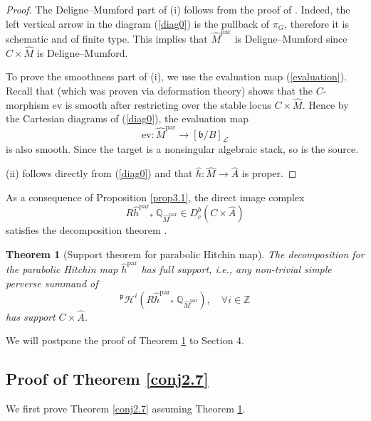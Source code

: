 \documentclass[11pt]{amsart}
\theoremstyle{plain}
\newtheorem{thm}{Theorem}[section]
\theoremstyle{definition}
\theoremstyle{remark}
\newcommand{\BQ}{{\mathbb{Q}}}
\newcommand{\BZ}{{\mathbb{Z}}}
\newcommand{\CH}{{\mathcal H}}
\newcommand{\CL}{{\mathcal L}}
\begin{document}
\begin{proof}
The Deligne--Mumford part of (i) follows from the proof of \cite[Proposition 2.5.1 (3)]{Yun1}. Indeed, the left vertical arrow in the diagram (\ref{diag0}) is the pullback of $\pi_G$, therefore it is schematic and of finite type. This implies that $\widehat{M}^{\mathrm{par}}$ is Deligne--Mumford since $C \times \widehat{M}$ is Deligne--Mumford.

To prove the smoothness part of (i), we use the evaluation map (\ref{evaluation}). Recall that \cite[Proposition 4.1]{MS} (which was proven via deformation theory) shows that the $C$-morphism $\mathrm{ev}$ is smooth after restricting over the stable locus $C \times \widehat{M}$. Hence by the Cartesian diagrams of (\ref{diag0}), the evaluation map
\[
\mathrm{ev}: \widehat{M}^{\mathrm{par}} \to {[\mathfrak{b}/B]_\CL}
\]
is also smooth. Since the target is a nonsingular algebraic stack, so is the source.

(ii) follows directly from (\ref{diag0}) and that $\widehat{h}: \widehat{M} \to \widehat{A}$ is proper.
\end{proof}

As a consequence of Proposition \ref{prop3.1}, the direct image complex
\[
R{\widehat{h}^{\mathrm{par}}}_* ~\BQ_{\widehat{M}^{\mathrm{par}}} \in D^b_c(C\times \widehat{A})
\]
satisfies the decomposition theorem \cite{BBD}.

\begin{thm}[Support theorem for parabolic Hitchin map]\label{thm3.2}
The decomposition for the parabolic Hitchin map $\widehat{h}^{\mathrm{par}}$ has full support, \emph{i.e.}, any non-trivial simple perverse summand of \[
^\mathfrak{p}\CH^i\left(R{\widehat{h}^{\mathrm{par}}}_* ~\BQ_{\widehat{M}^{\mathrm{par}}} \right), \quad  \forall i\in \BZ\]
has support $C\times \widehat{A}$.
\end{thm}

We will postpone the proof of Theorem \ref{thm3.2} to Section 4.


\subsection{Proof of Theorem \ref{conj2.7}}

We first prove Theorem \ref{conj2.7} assuming Theorem \ref{thm3.2}.
\end{document}
